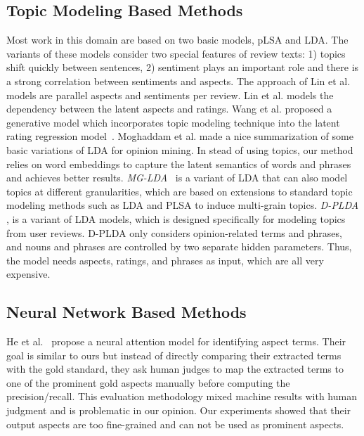 \documentclass[11pt,a4paper]{article}
\begin{document}
\subsection{Topic Modeling Based Methods}
Most work in this domain are based on two basic models, 
pLSA\cite{hofmann1999probabilistic} and LDA\cite{Blei2003LatentDA}. 
The variants of these models consider two special features of review texts:
1) topics shift quickly between sentences,
2) sentiment plays an important role and there is a strong 
correlation between sentiments and aspects. 
The approach of Lin et al.  models are 
parallel aspects and sentiments per review. 
Lin et al.  models the dependency between 
the latent aspects and ratings. Wang et al.  proposed 
a generative model which incorporates topic modeling technique 
into the latent rating regression model~\cite{wang2010latent}.
Moghaddam et al.  made a nice 
summarization of some basic variations of LDA for opinion mining.
In stead of using topics, our method relies on word embeddings to capture
the latent semantics of words and phrases and achieves better results.
\emph{MG-LDA}~\cite{titov2008modeling} is a variant of LDA that can also model topics at different granularities, which are based on extensions to standard topic modeling methods such as LDA and PLSA to induce multi-grain topics. 
\emph{D-PLDA} \cite{moghaddam2012design}, 
is a variant of LDA models, which is designed specifically for modeling topics from user reviews.  
D-PLDA only considers opinion-related terms and phrases, 
and nouns and phrases are controlled by two separate hidden parameters. Thus, the model needs aspects, ratings, and phrases as input, which are all very expensive.


\subsection{Neural Network Based Methods}
He et al.~  propose a neural attention model 
for identifying aspect terms. Their goal is similar to ours but instead of
directly comparing their extracted terms with the gold standard, they ask
human judges to map the extracted terms to one of the prominent gold 
aspects manually before computing the precision/recall. This evaluation 
methodology mixed machine results with human judgment and is problematic
in our opinion. 
Our experiments showed that their output aspects are too fine-grained and 
can not be used as prominent aspects.
\end{document}
